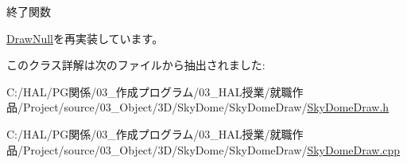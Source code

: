 終了関数 



\mbox{\hyperlink{class_draw_null_a12d44e341c7364b5ab9cdd661dc16187}{Draw\+Null}}を再実装しています。



このクラス詳解は次のファイルから抽出されました\+:\begin{DoxyCompactItemize}
\item 
C\+:/\+H\+A\+L/\+P\+G関係/03\+\_\+作成プログラム/03\+\_\+\+H\+A\+L授業/就職作品/\+Project/source/03\+\_\+\+Object/3\+D/\+Sky\+Dome/\+Sky\+Dome\+Draw/\mbox{\hyperlink{_sky_dome_draw_8h}{Sky\+Dome\+Draw.\+h}}\item 
C\+:/\+H\+A\+L/\+P\+G関係/03\+\_\+作成プログラム/03\+\_\+\+H\+A\+L授業/就職作品/\+Project/source/03\+\_\+\+Object/3\+D/\+Sky\+Dome/\+Sky\+Dome\+Draw/\mbox{\hyperlink{_sky_dome_draw_8cpp}{Sky\+Dome\+Draw.\+cpp}}\end{DoxyCompactItemize}
